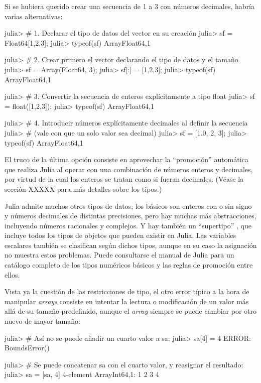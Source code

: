 Si se hubiera querido crear una secuencia de 1 a 3 con números decimales, habría varias alternativas:

\begin{jlconcode}
julia> # 1. Declarar el tipo de datos del vector en su creación
julia> sf = Float64[1,2,3];
julia> typeof(sf)
Array{Float64,1}

julia> # 2. Crear primero el vector declarando el tipo de datos y el tamaño
julia> sf = Array(Float64, 3);
julia> sf[:] = [1,2,3];
julia> typeof(sf)
Array{Float64,1}

julia> # 3. Convertir la secuencia de enteros explícitamente a tipo float
julia> sf = float([1,2,3]);
julia> typeof(sf)
Array{Float64,1}

julia> # 4. Introducir números explícitamente decimales al definir la secuencia
julia> # (vale con que un solo valor sea decimal)
julia> sf = [1.0, 2, 3];
julia> typeof(sf)
Array{Float64,1}
\end{jlconcode}

El truco de la última opción consiste en aprovechar la ``promoción'' automática que realiza Julia al operar con una combinación de números enteros y decimales, por virtud de la cual los enteros se tratan como si fueran decimales. (Véase la sección XXXXX para más detalles sobre los tipos.)

Julia admite muchos otros tipos de datos; los básicos son enteros con o sin signo y números decimales de distintas precisiones, pero hay muchas más abstracciones, incluyendo números racionales y complejos. Y hay también un ``supertipo'' , que incluye todos los tipos de objetos que pueden existir en Julia. Las variables escalares también se clasifican según dichos tipos, aunque en su caso la asignación no muestra estos problemas. Puede consultarse el manual de Julia para un catálogo completo de los tipos numéricos básicos y las reglas de promoción entre ellos.

Vista ya la cuestión de las restricciones de tipo, el otro error típico a la hora de manipular \emph{arrays} consiste en intentar la lectura o modificación de un valor más allá de su tamaño predefinido, aunque el \emph{array} siempre se puede cambiar por otro nuevo de mayor tamaño:

\begin{jlconcode}
julia> # Así no se puede añadir un cuarto valor a sa:
julia> sa[4] = 4
ERROR: BoundsError()

julia> # Se puede concatenar sa con el cuarto valor, y reasignar el resultado:
julia> sa = [sa, 4]
4-element Array{Int64,1}:
 1 
 2 
 3 
 4
\end{jlconcode}

